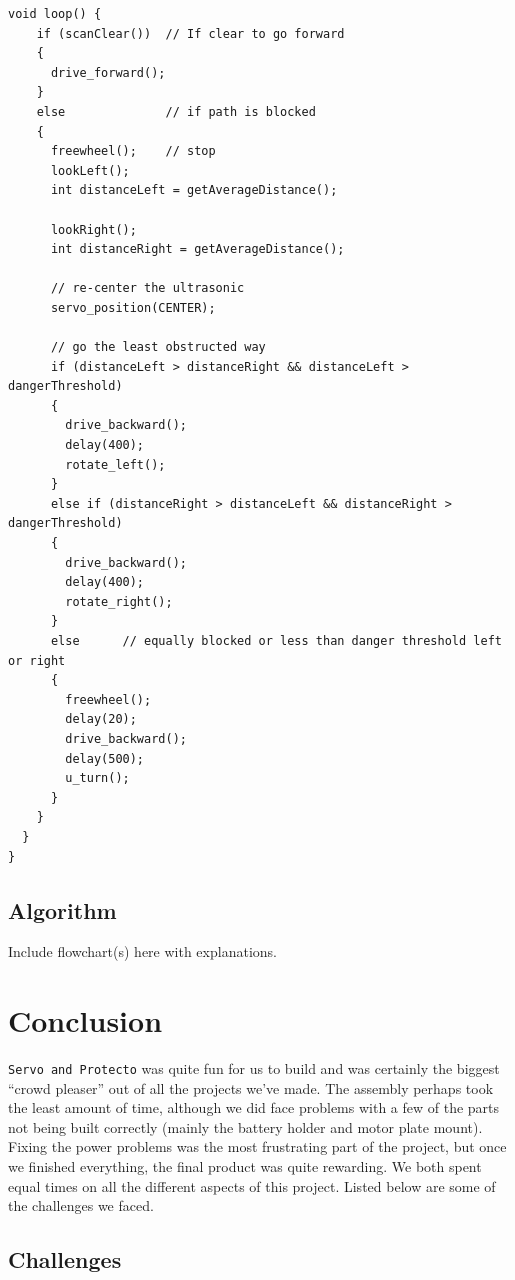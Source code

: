 \documentclass[11pt]{article}
\begin{document}
\vspace{12pt}

 \begin{lstlisting}[caption=Control Loop, label=loop]		
void loop() {
    if (scanClear())  // If clear to go forward
    {
      drive_forward();
    }
    else              // if path is blocked
    {
      freewheel();    // stop
      lookLeft();
      int distanceLeft = getAverageDistance();

      lookRight();
      int distanceRight = getAverageDistance();
      
      // re-center the ultrasonic
      servo_position(CENTER);

      // go the least obstructed way
      if (distanceLeft > distanceRight && distanceLeft > dangerThreshold)       
      {
        drive_backward();
        delay(400);
        rotate_left();
      }
      else if (distanceRight > distanceLeft && distanceRight > dangerThreshold) 
      {
        drive_backward();
        delay(400);
        rotate_right();
      }
      else 		// equally blocked or less than danger threshold left or right
      {
        freewheel();
        delay(20);
        drive_backward();
        delay(500);
        u_turn();
      }   
    } 
  }  
}
  \end{lstlisting}


\subsection{Algorithm}
Include flowchart(s) here with explanations.

\section{Conclusion}
\texttt{Servo and Protecto} was quite fun for us to build and was certainly the biggest ``crowd pleaser'' out of all the projects we've made.  The assembly perhaps took the least amount of time, although we did face problems with a few of the parts not being built correctly (mainly the battery holder and motor plate mount).  Fixing the power problems was the most frustrating part of the project, but once we finished everything, the final product was quite rewarding.  We both spent equal times on all the different aspects of this project.  Listed below are some of the challenges we faced.
	
	\subsection{Challenges}
		
\end{document}
